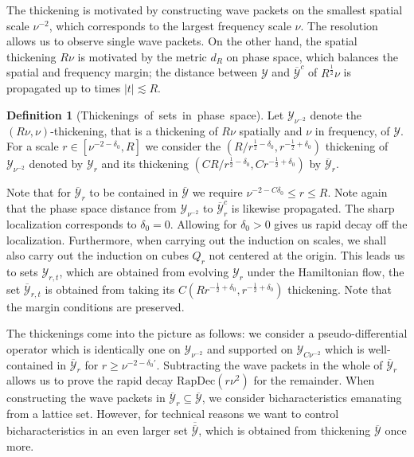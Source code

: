 \documentclass{amsart}
\theoremstyle{definition}
\newtheorem{definition}[theorem]{Definition}
\begin{document}
The thickening is motivated by constructing wave packets on the smallest spatial scale $\nu^{-2}$, which corresponds to the largest frequency scale $\nu$. The resolution allows us to observe single wave packets. On the other hand, the spatial thickening $R \nu$ is motivated by the metric $d_R$ on phase space, which balances the spatial and frequency margin; the distance between $\mathcal{Y}$ and $\overline{\mathcal{Y}}^c$ of $R^{\frac{1}{2}} \nu$ is propagated up to times $|t| \lesssim R$.
\begin{definition}[Thickenings~of~sets~in~phase~space]
\label{def:Thickening}
Let $\mathcal{Y}_{\nu^{-2}}$ denote the $(R \nu,\nu)$-thickening, that is a thickening of $R \nu$ spatially and $\nu$ in frequency, of $\mathcal{Y}$. For a scale $r \in [\nu^{-2-\delta_0},R]$ we consider the $(R / r^{\frac{1}{2}-\delta_0}, r^{-\frac{1}{2}+\delta_0})$ thickening of $\mathcal{Y}_{\nu^{-2}}$ denoted by $\mathcal{Y}_r$ and its thickening $(C R / r^{\frac{1}{2}-\delta_0},C r^{-\frac{1}{2}+\delta_0})$ by $\overline{\mathcal{Y}}_r$.
\end{definition}
Note that for $\overline{\mathcal{Y}}_r$ to be contained in $\overline{\mathcal{Y}}$ we require  $\nu^{-2-C\delta_0} \leq r \leq R$. Note again that the phase space distance from $\mathcal{Y}_{\nu^{-2}}$ to $\overline{\mathcal{Y}}_r^c$ is likewise propagated. The sharp localization corresponds to $\delta_0 = 0$. Allowing for $\delta_0 > 0$ gives us rapid decay off the localization. Furthermore, when carrying out the induction on scales, we shall also carry out the induction on cubes $Q_r$ not centered at the origin. This leads us to sets $\mathcal{Y}_{r,t}$, which are obtained from evolving $\mathcal{Y}_r$ under the Hamiltonian flow, the set $\overline{\mathcal{Y}}_{r,t}$ is obtained from taking its $C (R r^{-\frac{1}{2}+\delta_0}, r^{-\frac{1}{2}+\delta_0})$ thickening. Note that the margin conditions are preserved.


The thickenings come into the picture as follows: we consider a pseudo-differential operator which is identically one on $\mathcal{Y}_{\nu^{-2}}$ and supported on $\mathcal{Y}_{C \nu^{-2}}$ which is well-contained in $\overline{\mathcal{Y}}_r$ for $r \geq \nu^{-2-\delta_0'}$. Subtracting the wave packets in the whole of $\overline{\mathcal{Y}}_r$ allows us to prove the rapid decay $\text{RapDec}(r \nu^2)$ for the remainder. 
When constructing the wave packets in $\overline{\mathcal{Y}}_r \subseteq \overline{\mathcal{Y}}$, we consider bicharacteristics emanating from a lattice set. However, for technical reasons we want to control bicharacteristics in an even larger set $\overline{\overline{\mathcal{Y}}}$, which is obtained from thickening $\overline{\mathcal{Y}}$ once more.
\end{document}

